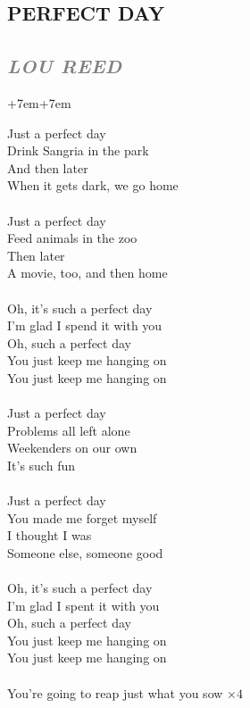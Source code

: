 \documentclass[100pt,a4paper]{report}
\newenvironment{song1}[3]
	{
			\begin{spacing}{0.6}
				\section*{\LARGE\centering \MakeUppercase{\textbf{{#1}}}}
				\subsection*{\Large\centering \textit{\textcolor{gray}{\MakeUppercase{{#2}}}}}
			\end{spacing}
			\vspace{0.8cm}
			\begin{adjustwidth}{+7em}{+7em}
			\Large
			
	}
	{
		\end{adjustwidth}
		\newpage
    }
\begin{document}
\begin{song1}{Perfect day}{Lou Reed}
\noindent
Just a perfect day\\
Drink Sangria in the park\\
And then later\\
When it gets dark, we go home\\
\\
Just a perfect day\\
Feed animals in the zoo\\
Then later\\
A movie, too, and then home\\
\\
Oh, it's such a perfect day\\
I'm glad I spend it with you\\
Oh, such a perfect day\\
You just keep me hanging on\\
You just keep me hanging on\\
\\
Just a perfect day\\
Problems all left alone\\
Weekenders on our own\\
It's such fun\\
\\
Just a perfect day\\
You made me forget myself\\
I thought I was\\
Someone else, someone good\\
\\
Oh, it's such a perfect day\\
I'm glad I spent it with you\\
Oh, such a perfect day\\
You just keep me hanging on\\
You just keep me hanging on\\
\\
You're going to reap just what you sow $\times 4$
\end{song1}
\end{document}
